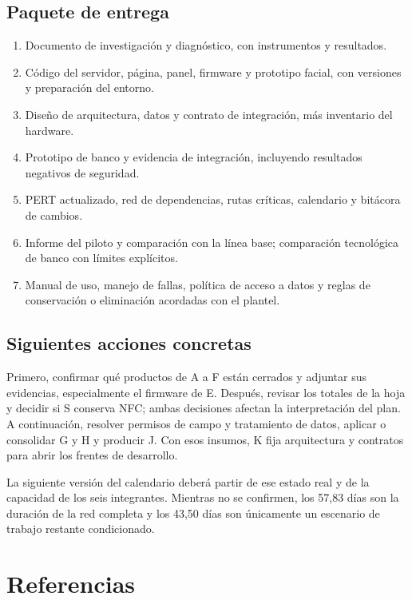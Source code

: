 \documentclass[11pt,letterpaper]{article}
\begin{document}
\subsection{Paquete de entrega}
\begin{enumerate}
\item Documento de investigación y diagnóstico, con instrumentos y resultados.
\item Código del servidor, página, panel, firmware y prototipo facial, con versiones y preparación del entorno.
\item Diseño de arquitectura, datos y contrato de integración, más inventario del hardware.
\item Prototipo de banco y evidencia de integración, incluyendo resultados negativos de seguridad.
\item PERT actualizado, red de dependencias, rutas críticas, calendario y bitácora de cambios.
\item Informe del piloto y comparación con la línea base; comparación tecnológica de banco con límites explícitos.
\item Manual de uso, manejo de fallas, política de acceso a datos y reglas de conservación o eliminación acordadas con el plantel.
\end{enumerate}

\subsection{Siguientes acciones concretas}
Primero, confirmar qué productos de A a F están cerrados y adjuntar sus evidencias, especialmente el firmware de E. Después, revisar los totales de la hoja y decidir si S conserva NFC; ambas decisiones afectan la interpretación del plan. A continuación, resolver permisos de campo y tratamiento de datos, aplicar o consolidar G y H y producir J. Con esos insumos, K fija arquitectura y contratos para abrir los frentes de desarrollo.

La siguiente versión del calendario deberá partir de ese estado real y de la capacidad de los seis integrantes. Mientras no se confirmen, los 57,83 días son la duración de la red completa y los 43,50 días son únicamente un escenario de trabajo restante condicionado.

\clearpage
\section{Referencias}
\printbibliography[heading=none]
\end{document}
